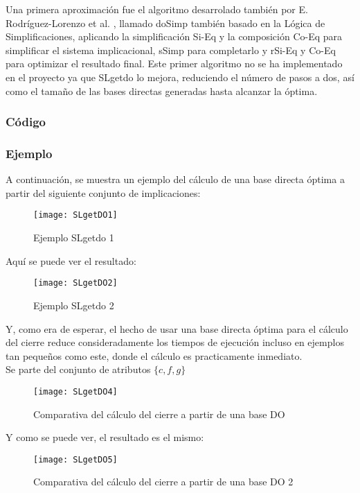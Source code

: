 Una primera aproximaci\'on  fue el algoritmo desarrolado tambi\'en por E. Rodr\'iguez-Lorenzo et al. \cite{doSimp}, llamado doSimp tambi\'en basado en la L\'ogica de Simplificaciones, aplicando la simplificaci\'on Si-Eq y la composici\'on Co-Eq para simplificar el sistema implicacional, sSimp para completarlo y rSi-Eq y Co-Eq para optimizar el resultado final. Este primer algoritmo no se ha implementado en el proyecto ya que SLgetdo lo mejora, reduciendo el n\'umero de pasos a dos, as\'i como el tama\~no de las bases directas generadas hasta alcanzar la \'optima.
\newpage
\subsubsection{C\'odigo} 

\newpage

\newpage
\subsubsection{Ejemplo} 
A continuaci\'on, se muestra un ejemplo del c\'alculo de una base directa \'optima a partir del siguiente conjunto de implicaciones: 
\begin{figure}[H]
    \centering
    \texttt{[image: SLgetDO1]}
    \caption{Ejemplo SLgetdo 1}
    \label{fig:SLgetDO1}
\end{figure} 

Aqu\'i se puede ver el resultado:
\begin{figure}[H]
    \centering
    \texttt{[image: SLgetDO2]}
    \caption{Ejemplo SLgetdo 2}
    \label{fig:SLgetDO2}
\end{figure} 
Y, como era de esperar, el hecho de usar una base directa \'optima para el c\'alculo del cierre reduce consideradamente los tiempos de ejecuci\'on incluso en ejemplos tan peque\~nos como este, donde el c\'alculo es practicamente inmediato.\\

Se parte del conjunto de atributos \(\{c,f,g\}\)

\begin{figure}[H]
    \centering
    \texttt{[image: SLgetDO4]}
    \caption{Comparativa del c\'alculo del cierre a partir de una base DO}
    \label{fig:SLgetDO4}
\end{figure}

Y como se puede ver, el resultado es el mismo:
\begin{figure}[H]
    \centering
    \texttt{[image: SLgetDO5]}
    \caption{Comparativa del c\'alculo del cierre a partir de una base DO 2}
    \label{fig:SLgetDO5}
\end{figure}

